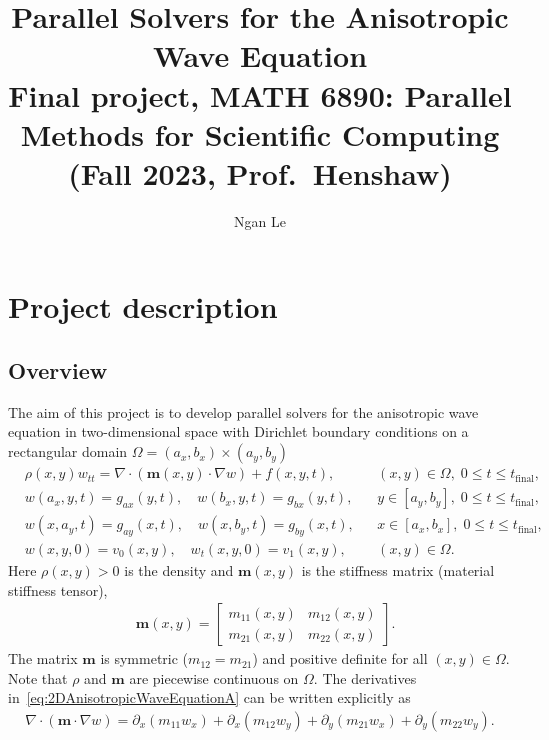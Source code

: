 \documentclass[11pt]{article}
\title{Parallel Solvers for the Anisotropic Wave Equation\\[1ex]
\large Final project, MATH 6890: Parallel Methods for Scientific Computing\\
(Fall 2023, Prof.\ Henshaw)}
\author{Ngan Le}
\date{}       %
\begin{document}
\maketitle

\section{Project description}
\subsection{Overview}
The aim of this project is to develop parallel solvers for the anisotropic wave equation in two-dimensional space with Dirichlet boundary conditions on a rectangular domain $\Omega = (a_x,b_x) \times (a_y,b_y)$
\begin{subequations}
\label{eq:2DAnisotropicWaveEquation}
\begin{align}
& \rho(x,y)w_{tt}=\nabla\cdot\left(\bm{m}(x,y)\cdot\nabla w\right) +f(x,y,t), && (x,y)\in \Omega,\; 0 \leq t \leq t_{\text{final}}, \label{eq:2DAnisotropicWaveEquationA} \\
& w(a_x,y,t) = g_{ax}(y,t), \quad w(b_x,y,t) = g_{bx}(y,t), && y \in [a_y,b_y],\; 0 \leq t \leq t_{\text{final}}, \label{eq:2DAnisotropicWaveEquationB} \\
& w(x,a_y,t) = g_{ay}(x,t), \quad w(x,b_y,t) = g_{by}(x,t), && x \in [a_x,b_x],\; 0 \leq t \leq t_{\text{final}}, \label{eq:2DAnisotropicWaveEquationC} \\
& w(x,y,0) = v_0(x,y), \quad w_t(x,y,0) = v_1(x,y), && (x,y) \in \Omega. \label{eq:2DAnisotropicWaveEquationD}
\end{align}
\end{subequations}
Here $\rho(x,y) > 0$ is the density and $\bm{m}(x,y)$ is the stiffness matrix (material stiffness tensor),
\begin{align*}
& \bm{m}(x,y)=\begin{bmatrix}
	m_{11}(x,y) & m_{12}(x,y)\\
	m_{21}(x,y) & m_{22}(x,y)
\end{bmatrix}.
\end{align*}
The matrix $\bm{m}$ is symmetric ($m_{12}=m_{21}$) and positive definite for all $(x,y)\in \Omega$. Note that $\rho$ and $\bm{m}$ are piecewise continuous on $\Omega$. The derivatives in~\eqref{eq:2DAnisotropicWaveEquationA} can be written explicitly as
\begin{align}
\nabla\cdot\left(\bm{m}\cdot\nabla w\right) = \partial_x (m_{11}w_x) + \partial_x (m_{12}w_y) + \partial_y (m_{21}w_x) + \partial_y (m_{22}w_y). \label{eq:2DAnisotropicOperator}
\end{align}
\end{document}
